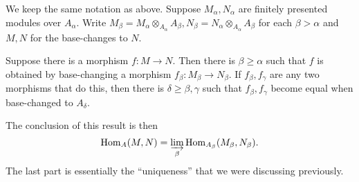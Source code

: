 \begin{proposition} \label{colimfpmodules} We keep the same notation as above.
Suppose $M_\alpha, N_\alpha$ are finitely presented modules over $A_\alpha$.
Write $M_\beta = M_\alpha \otimes_{A_\alpha} A_\beta, N_\beta = N_\alpha
\otimes_{A_\alpha} A_\beta$ for each $\beta > \alpha$ and $M, N$ for the
base-changes to $N$.

Suppose there is a morphism $f: M \to N$. Then there is $\beta \geq \alpha$ such
that $f$ is obtained by base-changing a morphism $f_\beta: M_\beta \to N_\beta$.
If $f_\beta, f_\gamma$ are any two morphisms that do this, then there is
$\delta \geq \beta, \gamma$ such that $f_\beta, f_\gamma$ become equal when
base-changed to $A_\delta$.
\end{proposition} 
The conclusion of this result is then
\[ \hom_A(M, N) = \varinjlim_{\beta} \hom_{A_\beta}(M_\beta, N_\beta).  \]
The last part is essentially the ``uniqueness'' that we were discussing previously.
